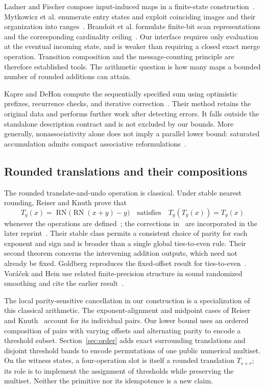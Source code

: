 \documentclass[11pt,reqno]{amsart}
\theoremstyle{definition}
\theoremstyle{remark}
\numberwithin{equation}{section}
\DeclareMathOperator{\RN}{RN}
\begin{document}
Ladner and Fischer compose input-induced maps in a finite-state
construction~\cite{ref1}. Mytkowicz et al. enumerate entry states and exploit
coinciding images and their organization into
ranges~\cite[Sections~3 and~5]{ref2}. Brandoit et al. formulate finite-bit scan
representations and the corresponding cardinality
ceiling~\cite[Section~5 and Appendices~F.4 and~G.2]{ref3}. Our interface
requires only evaluation at the eventual incoming state, and is weaker than
requiring a closed exact merge operation. Transition composition and the
message-counting principle are therefore established tools. The arithmetic
question is how many maps a bounded number of rounded additions can attain.

Kapre and DeHon compute the sequentially specified sum using optimistic
prefixes, recurrence checks, and iterative
correction~\cite[Section~III]{ref4}. Their method retains the original data and
performs further work after detecting errors. It falls outside the standalone
description contract and is not excluded by our bounds. More generally,
nonassociativity alone does not imply a parallel lower bound: saturated
accumulation admits compact associative reformulations~\cite{ref5}.

\subsection{Rounded translations and their compositions}

The rounded translate-and-undo operation is classical. Under stable nearest
rounding, Reiser and Knuth prove that
\[
 T_y(x)=\RN\bigl(\RN(x+y)-y\bigr)
 \quad\text{satisfies}\quad
 T_y(T_y(x))=T_y(x)
\]
whenever the operations are defined~\cite[p.~86, Theorem~1]{ref6}; the
corrections in~\cite{ref7} are incorporated in the later
reprint~\cite{ref18}. Their stable class permits a consistent choice of parity
for each exponent and sign and is broader than a single global ties-to-even
rule. Their second theorem concerns the intervening addition outputs, which
need not already be fixed. Goldberg reproduces the fixed-offset result for
ties-to-even~\cite[Theorem~5]{ref8}. Vor{\'a}{\v c}ek and Hein use related
finite-precision structure in sound randomized smoothing and cite the earlier
result~\cite[Section~3.1]{ref9}.

The local parity-sensitive cancellation in our construction is a
specialization of this classical arithmetic. The exponent-alignment and
midpoint cases of Reiser and Knuth~\cite[pp.~85--86]{ref6} account for its
individual pairs. Our lower bound uses an ordered composition of pairs with
varying offsets and alternating parity to encode a threshold subset.
Section~\ref{sec:order} adds exact surrounding translations and disjoint
threshold bands to encode permutations of one public numerical multiset. On
the witness states, a four-operation slot is itself a rounded translation
$T_{s+r}$; its role is to implement the assignment of thresholds while
preserving the multiset. Neither the primitive nor its idempotence is a new
claim.
\end{document}
